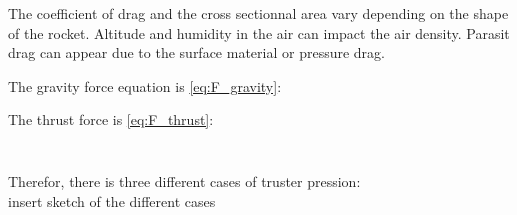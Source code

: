 The coefficient of drag and the cross sectionnal area vary depending on the shape of the rocket. Altitude and humidity in the air can impact the air density. Parasit drag can appear due to the surface material or pressure drag.

The gravity force equation is \eqref{eq:F_gravity}:
\begin{equation}
\end{equation}
\startexplain
{}
\stopexplain
	

The thrust force is \eqref{eq:F_thrust}:
\begin{equation}
\end{equation}
\startexplain
{}
\stopexplain



\begin{equation}
\end{equation}
\startexplain
{}
\stopexplain

\begin{equation}
\end{equation}
\startexplain
{}
\stopexplain

Therefor, there is three different cases of truster pression:
\begin{equation}
\end{equation}
 insert sketch of the different cases






